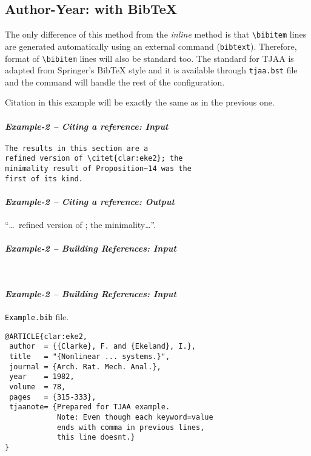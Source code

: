 \documentclass[usenatbib]{tjaa}
\begin{document}
\newpage
\subsection{Author-Year: with {\sc Bib}\TeX{}}

The only difference of this method from the \textit{inline} method is that
\verb|\bibitem| lines are generated automatically using an external command
(\verb|bibtext|).
Therefore, format of \verb|\bibitem| lines will also be standard too.
The standard for TJAA is adapted from Springer's {\sc Bib}\TeX{} style and it
is available through \verb|tjaa.bst| file and the command
\verb|| will handle the rest of the configuration.

Citation in this example will be exactly the same as in the previous one.

\paragraph*{\itshape Example-2 -- Citing a reference: Input}
\begin{verbatim}
The results in this section are a
refined version of \citet{clar:eke2}; the
minimality result of Proposition~14 was the
first of its kind.
\end{verbatim}

\paragraph*{\itshape Example-2 -- Citing a reference: Output}
``\dots\ refined version of \citet{clar:eke2}; the minimality\dots''.

\paragraph*{\itshape Example-2 -- Building References: Input}
\begin{verbatim}


\end{verbatim}
\paragraph*{\itshape Example-2 -- Building References: Input} \verb|Example.bib| file.
\begin{verbatim}
@ARTICLE{clar:eke2,
 author  = {{Clarke}, F. and {Ekeland}, I.},
 title   = "{Nonlinear ... systems.}",
 journal = {Arch. Rat. Mech. Anal.},
 year    = 1982,
 volume  = 78,
 pages   = {315-333},
 tjaanote= {Prepared for TJAA example.
            Note: Even though each keyword=value
            ends with comma in previous lines,
            this line doesnt.}
}
\end{verbatim}
\end{document}
